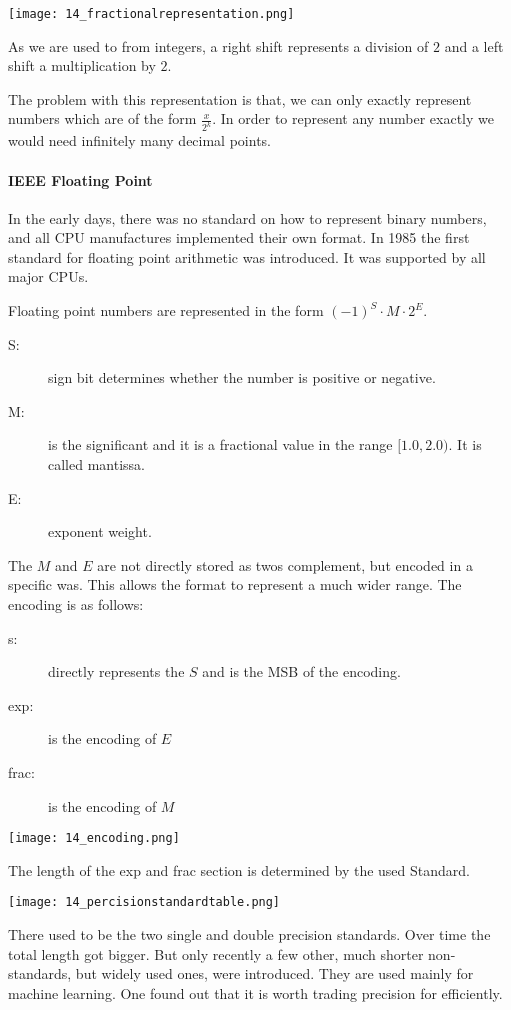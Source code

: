 \texttt{[image: 14\_fractionalrepresentation.png]}

As we are used to from integers, a right shift represents a division of $2$ and a left shift a multiplication by $2$. 

The problem with this representation is that, we can only exactly represent numbers which are of the form $\frac{x}{2^k}$. In order to represent any number exactly we would need infinitely many decimal points.

\paragraph{IEEE Floating Point}
In the early days, there was no standard on how to represent binary numbers, and all CPU manufactures implemented their own format. In 1985 the first standard for floating point arithmetic was introduced. It was supported by all major CPUs.

Floating point numbers are represented in the form $(-1)^S \cdot M \cdot 2^E$.
\begin{description}
    \item[S:] sign bit determines whether the number is positive or negative.
    \item[M:] is the significant and it is a fractional value in the range $[1.0, 2.0)$. It is called mantissa.
    \item[E:] exponent weight.
\end{description}

The $M$ and $E$ are not directly stored as twos complement, but encoded in a specific was. This allows the format to represent a much wider range. The encoding is as follows:
\begin{description}
    \item[s:] directly represents the $S$ and is the MSB of the encoding.
    \item[exp:] is the encoding of $E$
    \item[frac:] is the encoding of $M$
\end{description}

\texttt{[image: 14\_encoding.png]}

The length of the exp and frac section is determined by the used Standard.

\texttt{[image: 14\_percisionstandardtable.png]}

There used to be the two single and double precision standards. Over time the total length got bigger. But only recently a few other, much shorter non-standards, but widely used ones, were introduced. They are used mainly for machine learning. One found out that it is worth trading precision for efficiently.

